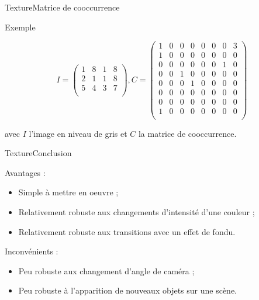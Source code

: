 \begin{frame}{Texture}{Matrice de cooccurrence}

\begin{exampleblock}{Exemple}

\[
 I = \begin{pmatrix}
     1 & 8 & 1 & 8 \\
     2 & 1 & 1 & 8 \\
     5 & 4 & 3 & 7 \\     
 \end{pmatrix}
, 
 C = \begin{pmatrix}
     1 & 0 & 0 & 0 & 0 & 0 & 0 & 3 \\
     1 & 0 & 0 & 0 & 0 & 0 & 0 & 0 \\
     0 & 0 & 0 & 0 & 0 & 0 & 1 & 0 \\
     0 & 0 & 1 & 0 & 0 & 0 & 0 & 0 \\
     0 & 0 & 0 & 1 & 0 & 0 & 0 & 0 \\
     0 & 0 & 0 & 0 & 0 & 0 & 0 & 0 \\
     0 & 0 & 0 & 0 & 0 & 0 & 0 & 0 \\
     1 & 0 & 0 & 0 & 0 & 0 & 0 & 0 \\   
 \end{pmatrix}
\]

avec $I$ l'image en niveau de gris et $C$ la matrice de cooccurrence.

\end{exampleblock}

\end{frame}

\begin{frame}{Texture}{Conclusion}

\begin{block}{Avantages :}

\begin{itemize}
    \item Simple à mettre en oeuvre ;
    \item Relativement robuste aux changements d'intensité d'une couleur ;
    \item Relativement robuste aux transitions avec un effet de fondu.
\end{itemize}

\end{block}

\begin{block}{Inconvénients :}

\begin{itemize}
    \item Peu robuste aux changement d'angle de caméra ;
   	\item Peu robuste à l'apparition de nouveaux objets sur une scène.
\end{itemize}

\end{block}

\end{frame}

